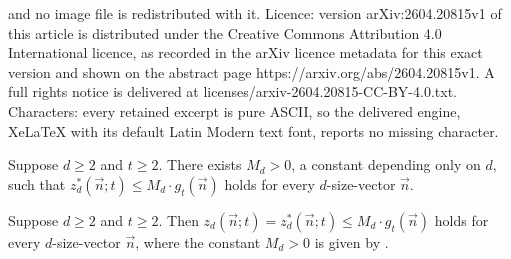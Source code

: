 \documentclass[10pt,a4paper]{amsart}
\newcommand*{\vn}{\vec{n}}
\begin{document}
and no image file is redistributed with it. Licence: version arXiv:2604.20815v1 of this article is distributed under the Creative Commons Attribution 4.0 International licence, as recorded in the arXiv licence metadata for this exact version and shown on the abstract page https://arxiv.org/abs/2604.20815v1. A full rights notice is delivered at licenses/arxiv-2604.20815-CC-BY-4.0.txt. Characters: every retained excerpt is pure ASCII, so the delivered engine, XeLaTeX with its default Latin Modern text font, reports no missing character.
\begin{proposition} \label{prop:upper_separated}
    Suppose $d \ge 2$ and $t \ge 2$. There exists $M_d > 0$, a constant depending only on $d$, such that $z_d^*(\vn; t) \le M_d \cdot g_t(\vn)$ holds for every $d$-size-vector $\vn$. 
\end{proposition}

\begin{proposition} \label{prop:upper_canonical}
    Suppose $d \ge 2$ and $t \ge 2$. Then $z_d(\vn; t) = z_d^*(\vn; t) \le M_d \cdot g_t(\vn)$ holds for every $d$-size-vector $\vn$, where the constant $M_d > 0$ is given by .
    \vspace{-0.5em}
\end{proposition}
\end{document}
